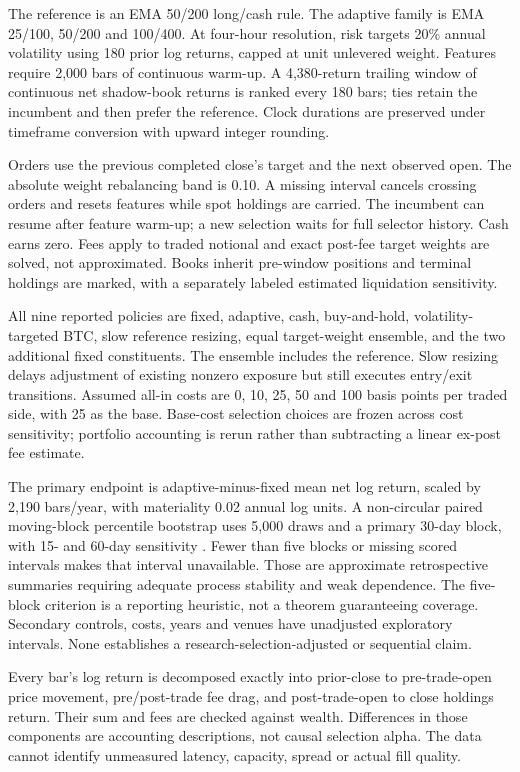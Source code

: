 The reference is an EMA 50/200 long/cash rule. The adaptive family is EMA
25/100, 50/200 and 100/400. At four-hour resolution, risk targets 20\% annual
volatility using 180 prior log returns, capped at unit unlevered weight. Features
require 2,000 bars of continuous warm-up. A 4,380-return trailing window of
continuous net shadow-book returns is ranked every 180 bars; ties retain the
incumbent and then prefer the reference. Clock durations are preserved under
timeframe conversion with upward integer rounding.

Orders use the previous completed close's target and the next observed open.
The absolute weight rebalancing band is 0.10. A missing interval cancels crossing
orders and resets features while spot holdings are carried. The incumbent can
resume after feature warm-up; a new selection waits for full selector history.
Cash earns zero. Fees apply to traded notional and exact post-fee target weights
are solved, not approximated. Books inherit pre-window positions and terminal
holdings are marked, with a separately labeled estimated liquidation sensitivity.

All nine reported policies are fixed, adaptive, cash, buy-and-hold, volatility-
targeted BTC, slow reference resizing, equal target-weight ensemble, and the
two additional fixed constituents. The ensemble includes the reference. Slow
resizing delays adjustment of existing nonzero exposure but still executes
entry/exit transitions. Assumed all-in costs are 0, 10, 25, 50 and 100 basis
points per traded side, with 25 as the base. Base-cost selection choices are
frozen across cost sensitivity; portfolio accounting is rerun rather than
subtracting a linear ex-post fee estimate.

The primary endpoint is adaptive-minus-fixed mean net log return, scaled by
2,190 bars/year, with materiality 0.02 annual log units. A non-circular paired
moving-block percentile bootstrap uses 5,000 draws and a primary 30-day block,
with 15- and 60-day sensitivity \citep{kunsch1989}. Fewer than five blocks or
missing scored intervals makes that interval unavailable. Those are approximate
retrospective summaries requiring adequate process stability and weak dependence.
The five-block criterion is a reporting heuristic, not a theorem guaranteeing
coverage. Secondary controls, costs, years and venues have unadjusted exploratory
intervals. None establishes a research-selection-adjusted or sequential claim.

Every bar's log return is decomposed exactly into prior-close to pre-trade-open
price movement, pre/post-trade fee drag, and post-trade-open to close holdings
return. Their sum and fees are checked against wealth. Differences in those
components are accounting descriptions, not causal selection alpha. The data
cannot identify unmeasured latency, capacity, spread or actual fill quality.
